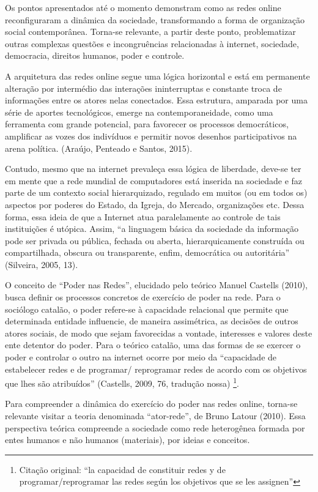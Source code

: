Os pontos apresentados até o momento demonstram como as redes online
reconfiguraram a dinâmica da sociedade, transformando a forma de
organização social contemporânea. Torna-se relevante, a partir deste
ponto, problematizar outras complexas questões e incongruências
relacionadas à internet, sociedade, democracia, direitos humanos, poder
e controle.

A arquitetura das redes online segue uma lógica horizontal e está em
permanente alteração por intermédio das interações ininterruptas e
constante troca de informações entre os atores nelas conectados. Essa
estrutura, amparada por uma série de aportes tecnológicos, emerge na
contemporaneidade, como uma ferramenta com grande potencial, para
favorecer os processos democráticos, amplificar as vozes dos indivíduos
e permitir novos desenhos participativos na arena política. (Araújo,
Penteado e Santos, 2015).

Contudo, mesmo que na internet prevaleça essa lógica de liberdade,
deve-se ter em mente que a rede mundial de computadores está inserida na
sociedade e faz parte de um contexto social hierarquizado, regulado em
muitos (ou em todos os) aspectos por poderes do Estado, da Igreja, do
Mercado, organizações etc. Dessa forma, essa ideia de que a Internet
atua paralelamente ao controle de tais instituições é utópica. Assim,
``a linguagem básica da sociedade da informação pode ser privada ou
pública, fechada ou aberta, hierarquicamente construída ou
compartilhada, obscura ou transparente, enfim, democrática ou
autoritária'' (Silveira, 2005, 13).

O conceito de ``Poder nas Redes'', elucidado pelo teórico Manuel
Castells (2010), busca definir os processos concretos de exercício de
poder na rede. Para o sociólogo catalão, o poder refere-se à capacidade
relacional que permite que determinada entidade influencie, de maneira
assimétrica, as decisões de outros atores sociais, de modo que sejam
favorecidas a vontade, interesses e valores deste ente detentor do
poder. Para o teórico catalão, uma das formas de se exercer o poder e
controlar o outro na internet ocorre por meio da ``capacidade de
estabelecer redes e de programar/ reprogramar redes de acordo com os
objetivos que lhes são atribuídos'' (Castells, 2009, 76, tradução nossa)
\footnote{Citação original: ``la capacidad de constituir redes y de
  programar/reprogramar las redes según los objetivos que se les
  assignen''}.

Para compreender a dinâmica do exercício do poder nas redes online,
torna-se relevante visitar a teoria denominada ``ator-rede'', de Bruno
Latour (2010). Essa perspectiva teórica compreende a sociedade como rede
heterogênea formada por entes humanos e não humanos (materiais), por
ideias e conceitos.


